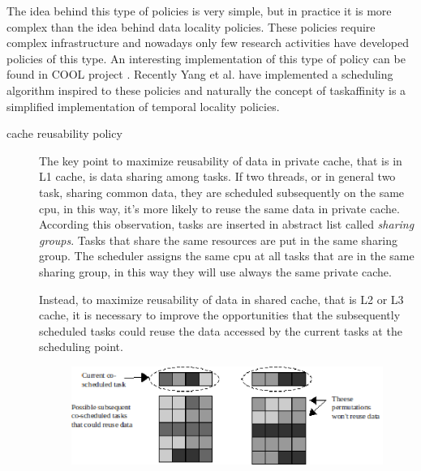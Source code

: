 The idea behind this type of policies is very simple, but in practice it is more complex than the idea behind data locality policies. These policies 
require complex infrastructure and nowadays only few research activities have developed policies of this type. An interesting implementation of this type 
of policy can be found in COOL project \cite{COOL}. Recently Yang et al. \cite{taiwan} have implemented a scheduling algorithm inspired to these policies 
and naturally the concept of taskaffinity is a simplified implementation of temporal locality policies.

\begin{description}
\item[cache reusability policy]
The key point to maximize reusability of data in private cache, that is in L1 cache, is data sharing among tasks. If two threads, or in general two task, 
sharing common data, they are scheduled subsequently on the same cpu, in this way, it's more likely to reuse the same data in private cache.
According this observation, tasks are inserted in abstract list called \textit{sharing groups}. Tasks that share the same resources are put in the 
same sharing group. The scheduler assigns the same cpu at all tasks that are in the same sharing group, in this way they will use always the same private 
cache. 

Instead, to maximize reusability of data in shared cache, that is L2 or L3 cache, it is necessary to improve the opportunities that the subsequently 
scheduled tasks could reuse the data accessed by the current tasks at the scheduling point.

\begin{figure}[htbp]
\centering
\includegraphics[width=\widefigure]{images/cosched_permutation.eps}
\caption{}
\label{fig:cosched_permutation}
\end{figure}



\end{description}
